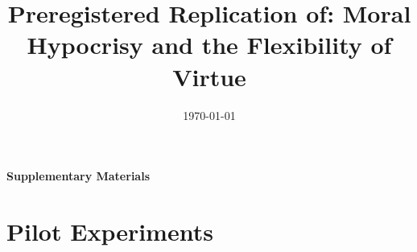 \documentclass[12pt,]{article}
\title{Preregistered Replication of: Moral Hypocrisy and the Flexibility of Virtue}
\author{}
\date{\today}
\begin{document}

\sloppy
\raggedbottom




\appendix
\begin{center}
\LARGE\bfseries Supplementary Materials
\end{center}

\tableofcontents



\newpage
\section{Pilot Experiments}
\label{appendix:pilot}
\end{document}

